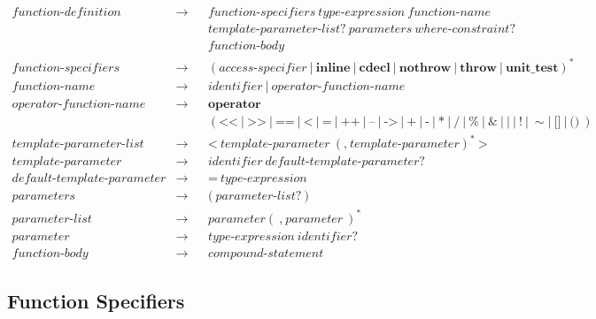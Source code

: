 \documentclass[a4paper,oneside,11pt]{article}
\begin{document}
\begin{align*}
function\textrm{-}definition &\rightarrow & &function\textrm{-}specifiers \> \hyperref[typeexpr]{type\textrm{-}expression} \> function\textrm{-}name\\
& & &template\textrm{-}parameter\textrm{-}list? \> parameters \> \hyperref[wherecontraint]{where\textrm{-}constraint}?\\
& & &function\textrm{-}body\\
function\textrm{-}specifiers &\rightarrow & &(\hyperref[accessspecifier]{access\textrm{-}specifier} \> | \> \textbf{inline} \> | \>
\textbf{cdecl} \> | \> \textbf{nothrow} \> | \> \textbf{throw} \> | \> \textbf{unit\_test})^*\\
function\textrm{-}name &\rightarrow & &\hyperref[identifier]{identifier} \> | \> operator\textrm{-}function\textrm{-}name\\
operator\textrm{-}function\textrm{-}name &\rightarrow & &\textbf{operator}\\
& & &( \texttt{<<} \> | \> \texttt{>>} \> | \> \texttt{==} \> | \> \texttt{<} \> | \> \texttt{=} \> | \>
\texttt{++} \> | \> \texttt{--} \> | \> \texttt{->} \> | \> \texttt{+} \> | \> \texttt{-} \> | \> \texttt{*} \> | \> \texttt{/} \> | \> \texttt{\%} \> | \>
\texttt{\&} \> | \> \texttt{|} \> | \> \texttt{!} \> | \> \sim | \> \texttt{[]} \> | \> \texttt{()} \>)\\
template\textrm{-}parameter\textrm{-}list &\rightarrow & &\texttt{<} \> template\textrm{-}parameter \> (\texttt{,} \> template\textrm{-}parameter)^* \> \texttt{>}\\
template\textrm{-}parameter &\rightarrow & &\hyperref[identifier]{identifier} \> default\textrm{-}template\textrm{-}parameter?\\
default\textrm{-}template\textrm{-}parameter &\rightarrow & &\texttt{=} \> \hyperref[typeexpr]{type\textrm{-}expression}\\
parameters &\rightarrow & &\texttt{(} \> parameter\textrm{-}list? \> \texttt{)}\\
parameter\textrm{-}list &\rightarrow & &parameter (\> \texttt{,} \> parameter \> )^*\\
parameter &\rightarrow & &\hyperref[typeexpr]{type\textrm{-}expression} \> \hyperref[identifier]{identifier}?\\
function\textrm{-}body &\rightarrow & &\hyperref[compoundstatement]{compound\textrm{-}statement}
\end{align*}

\subsection{Function Specifiers}
\end{document}
